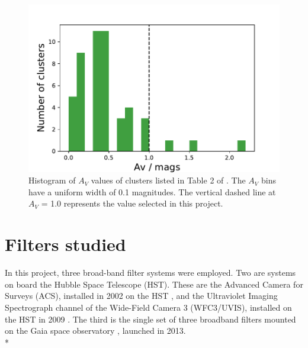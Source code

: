 \documentclass[12pt, a4paper]{report}
\begin{document}
\begin{figure}[h!]
\begin{center}
\includegraphics[width=1.0\textwidth]{../siegel_clusters_Av_vals_hist.pdf}
\caption{Histogram of $A_{V}$ values of clusters listed in Table 2 of \cite{2019AJ....158...35S}. The $A_{V}$ bins have a uniform width of 0.1 magnitudes. The vertical dashed line at $A_{V}$ = 1.0 represents the value selected in this project.}
\label{siegel_Av_vals}
\end{center}
\end{figure}

\section{Filters studied} \label{filter_desc}
In this project, three broad-band filter systems were employed. Two are systems on board the Hubble Space Telescope (HST). These are the Advanced Camera for Surveys (ACS), installed in 2002 on the HST \citep{2007AJ....133.1658S}, and the Ultraviolet Imaging Spectrograph channel of the Wide-Field Camera 3 (WFC3/UVIS), installed on the HST in 2009 \citep{2010wfc..rept...14K,2010SPIE.7731E..0ZM}. The third is the single set of three broadband filters mounted on the Gaia space observatory \citep{2010A&A...523A..48J,2018A&A...616A...4E}, launched in 2013. \\*
\end{document}
